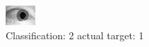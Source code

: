 \begin{figure}[h!]
\begin{center}
\includegraphics[width=0.60\columnwidth]{figures/ID1524_class_2_target_1.png}
\end{center}
\caption{ Classification: 2 actual target: 1}
\label{fig:ID1524_class_2_target_1}
\end{figure}
